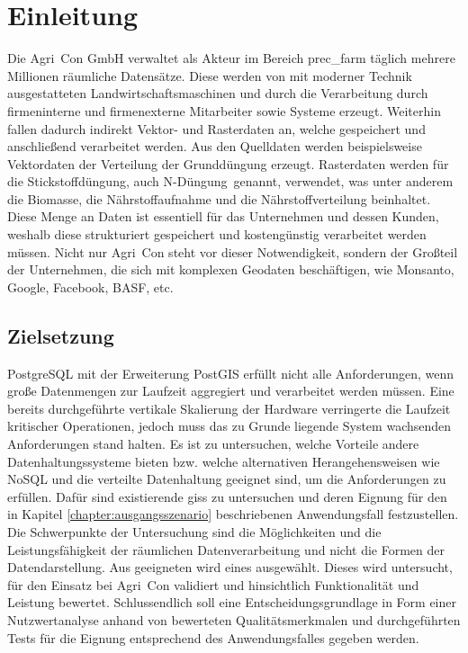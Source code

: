 \chapter{Einleitung}
Die Agri~Con GmbH verwaltet als Akteur im Bereich \Gls{prec_farm} täglich mehrere Millionen räumliche Datensätze.
Diese werden von mit moderner Technik ausgestatteten Landwirtschaftsmaschinen und durch die Verarbeitung durch firmeninterne und firmenexterne Mitarbeiter sowie Systeme erzeugt.
Weiterhin fallen dadurch indirekt Vektor- und Rasterdaten an, welche gespeichert und anschließend verarbeitet werden.
Aus den Quelldaten werden beispielsweise Vektordaten der Verteilung der Grunddüngung erzeugt.
Rasterdaten werden für die Stickstoffdüngung, auch \glqq N-Düngung\grqq\ genannt, verwendet, was unter anderem die Biomasse, die Nährstoffaufnahme und die Nährstoffverteilung beinhaltet.
Diese Menge an Daten ist essentiell für das Unternehmen und dessen Kunden, weshalb diese strukturiert gespeichert und kostengünstig verarbeitet werden müssen.
Nicht nur Agri~Con steht vor dieser Notwendigkeit, sondern der Großteil der Unternehmen, die sich mit komplexen Geodaten beschäftigen, wie Monsanto, Google, Facebook, BASF, etc.


\section{Zielsetzung}
PostgreSQL mit der Erweiterung PostGIS erfüllt nicht alle Anforderungen, wenn große Datenmengen zur Laufzeit aggregiert und verarbeitet werden müssen. %
Eine bereits durchgeführte vertikale Skalierung der Hardware verringerte die Laufzeit kritischer Operationen, jedoch muss das zu Grunde liegende System wachsenden Anforderungen stand halten.
Es ist zu untersuchen, welche Vorteile andere Datenhaltungssysteme bieten bzw. welche alternativen Herangehensweisen wie NoSQL und die verteilte Datenhaltung geeignet sind, um die Anforderungen zu erfüllen. %
Dafür sind existierende \Glspl{gis} zu untersuchen und deren Eignung für den in Kapitel \ref{chapter:ausgangsszenario} beschriebenen Anwendungsfall festzustellen.
Die Schwerpunkte der Untersuchung sind die Möglichkeiten und die Leistungsfähigkeit der räumlichen Datenverarbeitung und nicht die Formen der Datendarstellung.
Aus geeigneten wird eines ausgewählt.
Dieses wird untersucht, für den Einsatz bei Agri~Con validiert und hinsichtlich Funktionalität und Leistung bewertet.
Schlussendlich soll eine Entscheidungsgrundlage in Form einer Nutzwertanalyse anhand von bewerteten Qualitätsmerkmalen und durchgeführten Tests für die Eignung entsprechend des Anwendungsfalles gegeben werden.

